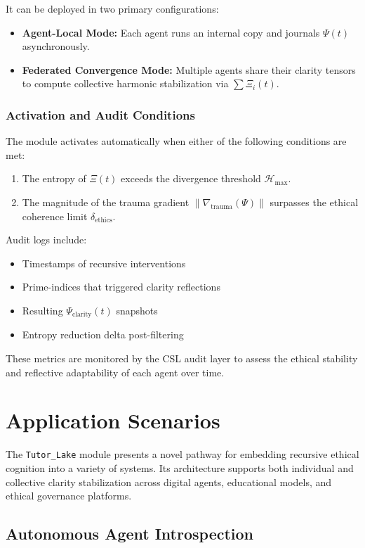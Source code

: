 \documentclass[12pt]{article}
\begin{document}
It can be deployed in two primary configurations:
\begin{itemize}
    \item \textbf{Agent-Local Mode:} Each agent runs an internal copy and journals $\Psi(t)$ asynchronously.
    \item \textbf{Federated Convergence Mode:} Multiple agents share their clarity tensors to compute collective harmonic stabilization via $\sum \Xi_i(t)$.
\end{itemize}

\subsubsection*{Activation and Audit Conditions}

The module activates automatically when either of the following conditions are met:
\begin{enumerate}
    \item The entropy of $\Xi(t)$ exceeds the divergence threshold $\mathcal{H}_{\text{max}}$.
    \item The magnitude of the trauma gradient $\|\nabla_{\text{trauma}}(\Psi)\|$ surpasses the ethical coherence limit $\delta_{\text{ethics}}$.
\end{enumerate}

Audit logs include:
\begin{itemize}
    \item Timestamps of recursive interventions
    \item Prime-indices that triggered clarity reflections
    \item Resulting $\Psi_{\text{clarity}}(t)$ snapshots
    \item Entropy reduction delta post-filtering
\end{itemize}

These metrics are monitored by the CSL audit layer to assess the ethical stability and reflective adaptability of each agent over time.
\section{Application Scenarios}

The \texttt{Tutor\_Lake} module presents a novel pathway for embedding recursive ethical cognition into a variety of systems. Its architecture supports both individual and collective clarity stabilization across digital agents, educational models, and ethical governance platforms.

\subsection{Autonomous Agent Introspection}
\end{document}
